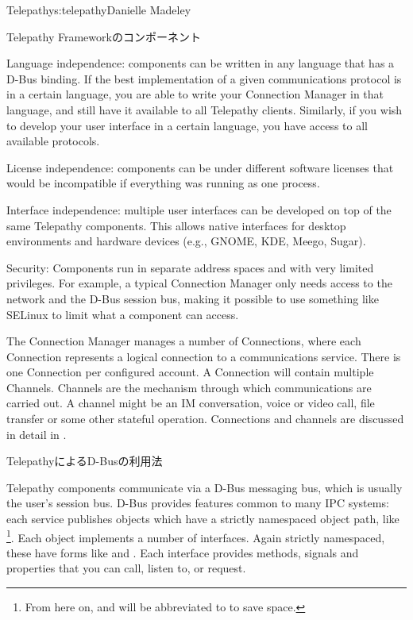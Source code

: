 \begin{aosachapter}{Telepathy}{s:telepathy}{Danielle Madeley}
\begin{aosasect1}{Telepathy Frameworkのコンポーネント}
\begin{aosadescription}
  \item{Language independence:} components can be written in any
  language that has a D-Bus binding. If the best
  implementation of a given communications protocol is in a certain
  language, you are able to write your Connection Manager in that
  language, and still have it available to all Telepathy clients.
  Similarly, if you wish to develop your user interface in a certain
  language, you have access to all available protocols.

  \item{License independence:} components can be under different
  software licenses that would be incompatible if everything was
  running as one process.

  \item{Interface independence:} multiple user interfaces can be
  developed on top of the same Telepathy components. This allows native
  interfaces for desktop environments and hardware devices
  (e.g., GNOME, KDE, Meego, Sugar).

  \item{Security:} Components run in separate address spaces and
  with very limited privileges.  For example, a typical
  Connection Manager only needs access to the network and the D-Bus
  session bus, making it possible to use something like SELinux to
  limit what a component can access.

\end{aosadescription}

The Connection Manager manages a number of Connections, where each
Connection represents a logical connection to a communications
service. There is one Connection per configured account.
A Connection will contain multiple Channels. Channels are the
mechanism through which communications are carried out. A channel
might be an IM conversation, voice or video call, file transfer or
some other stateful operation.  Connections and channels are discussed
in detail in .

\end{aosasect1}

\begin{aosasect1}{TelepathyによるD-Busの利用法}

Telepathy components communicate via a D-Bus messaging bus, which is
usually the user's session bus.  D-Bus provides features common to
many IPC systems: each service publishes objects which have
a strictly namespaced object path, like
\footnote{From here
on,  and
 will be abbreviated to 
to save space.}.  Each object implements a number of
interfaces. Again strictly namespaced, these have forms like
 and .
Each interface provides methods, signals and properties that you can
call, listen to, or request.


\end{aosasect1}
\end{aosachapter}
